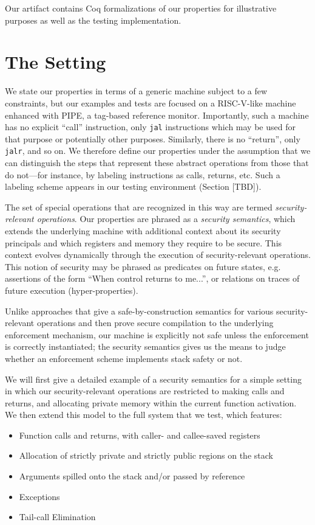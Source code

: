 \documentclass[10pt,conference]{ieeetran}%
\theoremstyle{definition}
\begin{document}
Our artifact contains Coq formalizations of our properties for illustrative purposes
as well as the testing implementation.

\section{The Setting}

We state our properties in terms of a generic machine subject to a few constraints,
but our examples and tests are focused on a RISC-V-like machine enhanced with PIPE,
a tag-based reference monitor. Importantly, such a machine has no explicit ``call''
instruction, only {\tt jal} instructions which may be used for that purpose or potentially
other purposes. Similarly, there is no ``return'', only {\tt jalr}, and so on.
We therefore define our properties under the assumption that we can distinguish the
steps that represent these abstract operations from those that do not---for instance,
by labeling instructions as calls, returns, etc.
Such a labeling scheme appears in our testing environment (Section [TBD]).%

The set of special operations that are recognized in this way are termed
{\it security-relevant operations}. Our properties are phrased as a {\it security semantics},
which extends the underlying machine with additional context about its
security principals and which registers and memory they require to be secure.
This context evolves dynamically through the execution of security-relevant operations.
This notion of security may be phrased as
predicates on future states, e.g. assertions of the form
``When control returns to me...'', or relations on traces of future execution
(hyper-properties).

Unlike approaches that give a safe-by-construction semantics
for various security-relevant operations and then prove secure compilation to the underlying
enforcement mechanism, our machine is explicitly not safe unless the enforcement
is correctly instantiated; the security semantics gives us the means to judge whether
an enforcement scheme implements stack safety or not. 

We will first give a detailed example of a security semantics for a simple setting
in which our security-relevant operations are restricted to making calls and returns, and allocating
private memory within the current function activation. We then extend this model
to the full system that we test, which features:
\begin{itemize}
\item Function calls and returns, with caller- and callee-saved registers
\item Allocation of strictly private and strictly public regions on the stack
\item Arguments spilled onto the stack and/or passed by reference
\item Exceptions
\item Tail-call Elimination
\end{itemize}
\end{document}
